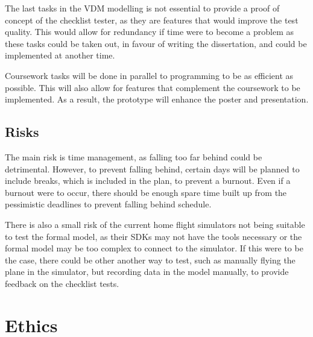\documentclass[a4paper]{article}
\begin{document}
The last tasks in the VDM modelling is not essential to provide a proof of 
concept of the checklist tester, as they are features that would improve the 
test quality. This would allow for redundancy if time were to become a problem 
as these tasks could be taken out, in favour of writing the dissertation,
and could be implemented at another time.

Coursework tasks will be done in parallel to programming to
be as efficient as possible. This will also allow for features that 
complement the coursework to be implemented. As a result, the 
prototype will enhance the poster and presentation.

\subsection{Risks}

The main risk is time management, as falling too far behind could 
be detrimental. However, to prevent falling behind, certain days 
will be planned to include breaks, which is included in the plan,
to prevent a burnout. Even if a burnout were to occur, there should be 
enough spare time built up from the pessimistic deadlines to 
prevent falling behind schedule. 

There is also a small risk of the current home flight simulators not 
being suitable to test the formal model, as their SDKs may not have 
the tools necessary or the formal model may be too complex to connect to 
the simulator. If this were to be the case, there could be other 
another way to test, such as manually flying the plane in the simulator, 
but recording data in the model manually, to provide feedback on the 
checklist tests.

\clearpage

\section{Ethics}
\end{document}
